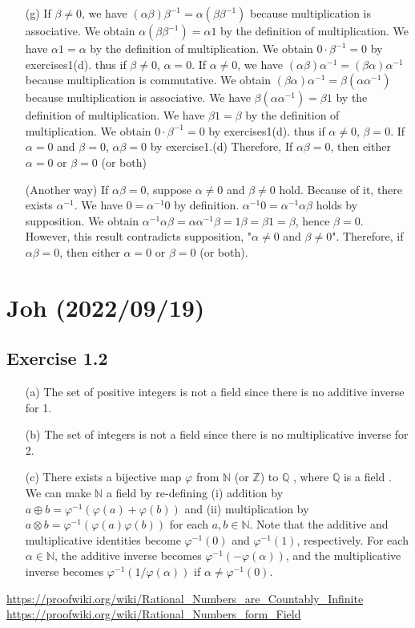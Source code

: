 \documentclass{article}
\begin{document}
\begin{itemize}
  \item[(g)]If $\beta \neq 0$, we have $(\alpha\beta)\beta^{-1}=\alpha(\beta\beta^{-1})$ because multiplication is associative.
    We obtain $\alpha(\beta\beta^{-1}) = \alpha1$ by the definition of multiplication.
    We have $\alpha1 = \alpha$ by the definition of multiplication.
    We obtain $0\cdot\beta^{-1} = 0$ by exercises1(d).
    thus if $\beta \neq 0$, $\alpha = 0$.
    If $\alpha \neq 0$, we have $(\alpha\beta)\alpha^{-1} = (\beta\alpha)\alpha^{-1}$ because multiplication is commutative.
    We obtain $(\beta\alpha)\alpha^{-1} = \beta(\alpha\alpha^{-1})$ because multiplication is associative.
    We have $\beta(\alpha\alpha^{-1}) = \beta1$  by the definition of multiplication.
    We have $\beta1 = \beta$ by the definition of multiplication.
    We obtain $0\cdot\beta^{-1} = 0$ by exercises1(d).
    thus if $\alpha \neq 0$, $\beta = 0$.
    If $\alpha = 0$ and $\beta = 0$, $\alpha\beta = 0$ by exercise1.(d)
    Therefore, If $\alpha\beta = 0$, then either $\alpha = 0$ or $\beta = 0$ (or both)

    (Another way)
    If $\alpha\beta = 0$,
    suppose $\alpha \neq 0$ and $\beta \neq 0$ hold.
    Because of it, there exists $\alpha^{-1}$.
    We have $0 = \alpha^{-1}0$ by definition.
    $\alpha^{-1}0 = \alpha^{-1}\alpha\beta$ holds by supposition.
    We obtain $\alpha^{-1}\alpha\beta = \alpha\alpha^{-1}\beta = 1\beta = \beta1 = \beta$,
    hence $\beta = 0$.
    However, this result contradicts supposition, "$\alpha \neq 0$ and $\beta \neq 0$".
    Therefore, if $\alpha\beta = 0$, then either $\alpha = 0$ or $\beta = 0$ (or both).
    
\end{itemize}
\section{Joh (2022/09/19)}
\subsection{Exercise 1.2}
\begin{itemize}
  \item[(a)] The set of positive integers is not a field since there is no additive inverse for 1.
  \item[(b)] The set of integers is not a field since there is no multiplicative inverse for 2.
  \item[(c)] There exists a bijective map $\varphi$ from $\mathbb{N}$ (or $\mathbb{Z}$) to $\mathbb{Q}$ \cite{Q_countable}, where $\mathbb{Q}$ is a field \cite{Q_field}.
  	We can make $\mathbb{N}$ a field by re-defining (i) addition by $a \oplus b = \varphi^{-1} (\varphi(a) + \varphi(b))$ and (ii) multiplication by $a \otimes b = \varphi^{-1}(\varphi(a)\varphi(b))$ for each $a, b \in \mathbb{N}$.
	Note that the additive and multiplicative identities become $\varphi^{-1}(0)$ and $\varphi^{-1}(1)$, respectively.
	For each $\alpha\in\mathbb{N}$, the additive inverse becomes $\varphi^{-1}(-\varphi(\alpha))$, and the multiplicative inverse becomes $\varphi^{-1}(1/\varphi(\alpha))$ if $\alpha\ne\varphi^{-1}(0)$.
\end{itemize}

\begin{thebibliography}{9}
 \url{https://proofwiki.org/wiki/Rational_Numbers_are_Countably_Infinite}
 \url{https://proofwiki.org/wiki/Rational_Numbers_form_Field}
\end{thebibliography}
\end{document}
